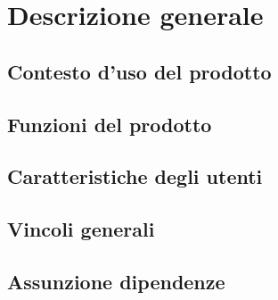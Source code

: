 \newpage
\section{Descrizione generale}
\subsection{Contesto d'uso del prodotto}
\subsection{Funzioni del prodotto}
\subsection{Caratteristiche degli utenti}
\subsection{Vincoli generali}
\subsection{Assunzione dipendenze}
